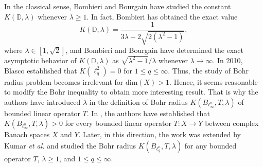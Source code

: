 \documentclass[a4paper,12pt]{amsart}
\theoremstyle{definition}
\begin{document}
In the classical sense, Bombieri and Bourgain \cite{bombieri-1962,bombieri-2004} have studied the constant $K(\mathbb{D},\lambda)$ whenever $\lambda\geq 1$. In fact, Bombieri \cite{bombieri-1962} has obtained the exact value 
\begin{equation*}
	K(\mathbb{D},\lambda)=\frac{1}{3\lambda-2\sqrt{2(\lambda^2-1)}},
\end{equation*}
 where $\lambda \in [1,\sqrt{2}]$, and Bombieri and Bourgain \cite{bombieri-2004} have determined the exact asymptotic behavior of $K(\mathbb{D},\lambda)$ as $\sqrt{\lambda^2-1}/\lambda$ whenever $\lambda \rightarrow \infty$. In 2010, Blasco \cite{Blasco-OTAA-2010} established that $K(\ell^2_q)=0$ for $1\leq q\leq \infty$. Thus, the study of Bohr radius problem becomes irrelevant for $\text{dim}(X)>1$. Hence, it seems reasonable to modify the Bohr inequality to obtain more interesting result. That is why the authors \cite{defant-adv-math-2012} have introduced $\lambda$ in the definition of Bohr radius $K(B_{\ell^n_{\infty}},T,\lambda)$ of bounded linear operator $T$. In \cite{defant-adv-math-2012}, the authors have established that $K(B_{\ell^n_{\infty}},T,\lambda)>0$ for every bounded linear operator $T:X\rightarrow Y$ between complex Banach spaces $X$ and $Y$. Later, in this direction, the work was extended by Kumar {\it et al.} \cite{kumar-2023-arxiv} and studied the Bohr radius $K(B_{\ell^n_q},T,\lambda)$ for any bounded operator $T$, $\lambda\geq 1$, and $1\leq q\leq \infty$.\\[0.5mm]
 
\end{document}
